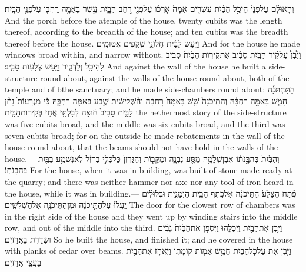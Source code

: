 {וְהָאוּלָ֗ם עַל\maqqaf פְּנֵי֙ הֵיכַ֣ל הַבַּ֔יִת עֶשְׂרִ֤ים אַמָּה֙ אׇרְכּ֔וֹ עַל\maqqaf פְּנֵ֖י רֹ֣חַב הַבָּ֑יִת עֶ֧שֶׂר בָּאַמָּ֛ה רׇחְבּ֖וֹ עַל\maqqaf פְּנֵ֥י הַבָּֽיִת׃}
{And the porch before the atemple of the house, twenty cubits was the length thereof, according to the breadth of the house; and ten cubits was the breadth thereof before the house.}
{וַיַּ֣עַשׂ לַבָּ֔יִת חַלּוֹנֵ֖י שְׁקֻפִ֥ים אֲטוּמִֽים׃}
{And for the house he made windows broad within, and narrow without.}
{וַיִּ֩בֶן֩ עַל\maqqaf קִ֨יר הַבַּ֤יִת  סָבִ֔יב אֶת\maqqaf קִיר֤וֹת הַבַּ֙יִת֙ סָבִ֔יב לַהֵיכָ֖ל וְלַדְּבִ֑יר וַיַּ֥עַשׂ צְלָע֖וֹת סָבִֽיב׃}
{And against the wall of the house he built a side-structure round about, against the walls of the house round about, both of the temple and of bthe sanctuary; and he made side-chambers round about;}
{ הַתַּחְתֹּנָ֜ה חָמֵ֧שׁ בָּאַמָּ֣ה רׇחְבָּ֗הּ וְהַתִּֽיכֹנָה֙ שֵׁ֤שׁ בָּאַמָּה֙ רׇחְבָּ֔הּ וְהַ֨שְּׁלִישִׁ֔ית שֶׁ֥בַע בָּאַמָּ֖ה רׇחְבָּ֑הּ כִּ֡י מִגְרָעוֹת֩ נָתַ֨ן לַבַּ֤יִת סָבִיב֙ ח֔וּצָה לְבִלְתִּ֖י אֲחֹ֥ז בְּקִירוֹת\maqqaf הַבָּֽיִת׃}
{the nethermost story of the side-structure was five cubits broad, and the middle was six cubits broad, and the third was seven cubits broad; for on the outside he made rebatements in the wall of the house round about, that the beams should not have hold in the walls of the house.—}
{וְהַבַּ֙יִת֙ בְּהִבָּ֣נֹת֔וֹ אֶבֶן\maqqaf שְׁלֵמָ֥ה מַסָּ֖ע נִבְנָ֑ה וּמַקָּב֤וֹת וְהַגַּרְזֶן֙ כׇּל\maqqaf כְּלִ֣י בַרְזֶ֔ל לֹֽא\maqqaf נִשְׁמַ֥ע בַּבַּ֖יִת בְּהִבָּנֹתֽוֹ׃}
{For the house, when it was in building, was built of stone made ready at the quarry; and there was neither hammer nor axe nor any tool of iron heard in the house, while it was in building.—}
{פֶּ֗תַח הַצֵּלָע֙ הַתִּ֣יכֹנָ֔ה אֶל\maqqaf כֶּ֥תֶף הַבַּ֖יִת הַיְמָנִ֑ית וּבְלוּלִּ֗ים יַֽעֲלוּ֙ עַל\maqqaf הַתִּ֣יכֹנָ֔ה וּמִן\maqqaf הַתִּיכֹנָ֖ה אֶל\maqqaf הַשְּׁלִשִֽׁים׃}
{The door for the clowest row of chambers was in the right side of the house and they went up by winding stairs into the middle row, and out of the middle into the third.}
{וַיִּ֥בֶן אֶת\maqqaf הַבַּ֖יִת וַיְכַלֵּ֑הוּ וַיִּסְפֹּ֤ן אֶת\maqqaf הַבַּ֙יִת֙ גֵּבִ֔ים וּשְׂדֵרֹ֖ת בָּאֲרָזִֽים׃}
{So he built the house, and finished it; and he covered in the house with planks of cedar over beams.}
{וַיִּ֤בֶן אֶת\maqqaf {} עַל\maqqaf כׇּל\maqqaf הַבַּ֔יִת חָמֵ֥שׁ אַמּ֖וֹת קוֹמָת֑וֹ וַיֶּאֱחֹ֥ז אֶת\maqqaf הַבַּ֖יִת בַּעֲצֵ֥י אֲרָזִֽים׃ \petucha }

